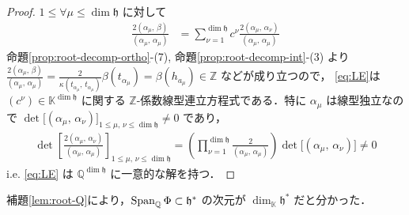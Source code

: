 \documentclass[rep_main]{subfiles}
\begin{document}
\begin{proof}
	$1 \le \forall \mu \le \dim \mathfrak{h}$ に対して
	\begin{align}
		\label{eq:LE}
		\frac{2(\alpha_\mu,\, \beta) }{(\alpha_\mu,\, \alpha_\mu)}
		&= \sum_{\nu = 1}^{\dim \mathfrak{h}} c^\nu \frac{2(\alpha_\mu,\, \alpha_\nu)}{(\alpha_\mu,\, \alpha_\mu)}
	\end{align}
	命題\ref{prop:root-decomp-ortho}-(7), 命題\ref{prop:root-decomp-int}-(3) より $\frac{2(\alpha_\mu,\, \beta) }{(\alpha_\mu,\, \alpha_\mu)} = \frac{2}{\kappa(t_{\alpha_\mu},\, t_{\alpha_\mu})}\beta(t_{\alpha_\mu}) = \beta(h_{a_\mu}) \in \mathbb{Z}$ などが成り立つので，
	\eqref{eq:LE}は $(c^\nu) \in \mathbb{K}^{\dim \mathfrak{h}}$ に関する $\mathbb{Z}$-係数線型連立方程式である．特に $\alpha_\mu$ は線型独立なので $\det \bigl[ (\alpha_\mu,\, \alpha_\nu) \bigr]_{1 \le \mu,\, \nu \le \dim \mathfrak{h}} \neq 0$ であり，
	\begin{align}
		\det \left[ \frac{2(\alpha_\mu,\, \alpha_\nu)}{(\alpha_\mu,\, \alpha_\mu)} \right]_{1 \le \mu,\, \nu \le \dim \mathfrak{h}} = \left( \prod_{\nu = 1}^{\dim \mathfrak{h}} \frac{2}{(\alpha_\mu,\, \alpha_\mu)}\right)  \det \bigl[ (\alpha_\mu,\, \alpha_\nu) \bigr] \neq 0
	\end{align}
	i.e. \eqref{eq:LE} は $\mathbb{Q}^{\dim \mathfrak{h}}$ に一意的な解を持つ．
\end{proof}

補題\ref{lem:root-Q}により，$\operatorname{Span}_{\mathbb{Q}} \Phi \subset \mathfrak{h}^*$ の次元が $\dim_{\mathbb{K}} \mathfrak{h}^*$ だと分かった．
\end{document}

